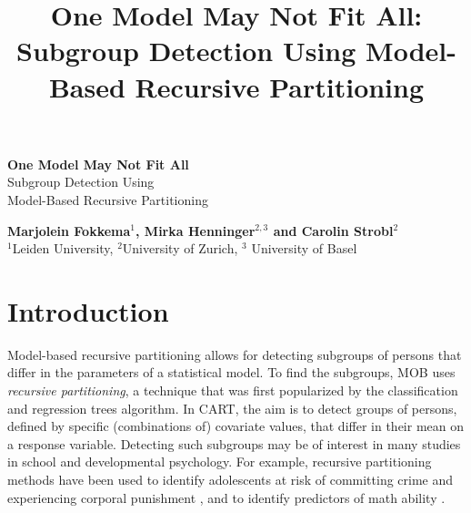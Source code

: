 \documentclass[doc,floatsintext,natbib]{apa7}
\title{One Model May Not Fit All: Subgroup Detection Using Model-Based Recursive Partitioning}
\begin{document}

\renewenvironment{Schunk}{\small}{}



\begin{titlepage}
   \begin{center}
       \vspace*{1cm}

       \textbf{\large One Model May Not Fit All}\\

       \vspace{0.5cm}
        \large Subgroup Detection Using\\Model-Based Recursive Partitioning\\
            
       \vspace{1.5cm}

       \textbf{Marjolein Fokkema$^1$, Mirka Henninger$^{2,3}$ and Carolin Strobl$^2$}\\
       $^1$Leiden University, $^2$University of Zurich, $^3$ University of Basel

       \vfill

            
       \vspace{0.8cm}
     

   \end{center}
\end{titlepage}


\maketitle



\newpage
\section{Introduction}
\label{sec:Introduction}

Model-based recursive partitioning \citep[MOB;][]{ZeilyHoth08} %
allows for detecting subgroups of persons that differ in the parameters of a statistical model. To find the subgroups, MOB uses \textit{recursive partitioning}, a technique that was first popularized by the classification and regression trees \citep[CART; ][]{Breetal:1984} algorithm. In CART, the aim is to detect groups of persons, defined by specific (combinations of) covariate values, that differ in their mean on a response variable. Detecting such subgroups may be of interest in many studies in school and developmental psychology. For example, recursive partitioning methods have been used to identify adolescents at risk of committing crime \citep{FrityHaup19} and experiencing corporal punishment \citep{StemyHein19}, and to identify predictors of math ability \citep{DingyZhao19}.
\end{document}
